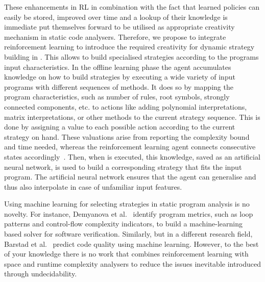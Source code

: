 \documentclass[envcountsame]{llncs}
\begin{document}
These enhancements in RL in combination with the fact that learned policies can easily be stored,
improved over time and a lookup of their knowledge is immediate put themselves forward to be
utilised as appropriate creativity mechanism in static code analysers.
%
Therefore, we propose to integrate reinforcement learning to introduce the required creativity for
dynamic strategy building in \tct{}. This allows to build specialised strategies according to the
programs input characteristics.
%
In the offline learning phase the agent accumulates knowledge on how to build strategies by
executing a wide variety of input programs with different sequences of methods. It does so by
mapping the program characteristics, such as number of rules, root symbols, strongly connected
components, etc\@. to actions like adding polynomial interpretations, matrix interpretations, or
other methods to the current strategy sequence. This is done by assigning a value to each possible
action according to the current strategy on hand. These valuations arise from reporting the
complexity bound and time needed, whereas the reinforcement learning agent connects consecutive
states accordingly~\cite{sutton1998introduction}.
%
Then, when \tct{} is executed, this knowledge, saved as an artificial neural network, is used to
build a corresponding strategy that fits the input program. The artificial neural network ensures
that the agent can generalise and thus also interpolate in case of unfamiliar input features.

%


Using machine learning for selecting strategies in static program analysis is no novelty. For
instance, Demyanova et al.~\cite{demyanova2017empirical} identify program metrics, such as loop
patterns and control-flow complexity indicators, to build a machine-learning based solver for
software verification. Similarly, but in a different research field, Barstad et
al.~\cite{barstad2014predicting} predict code quality using machine learning. However, to the best
of your knowledge there is no work that combines reinforcement learning with space and runtime
complexity analysers to reduce the issues inevitable introduced through undecidability.
\end{document}
